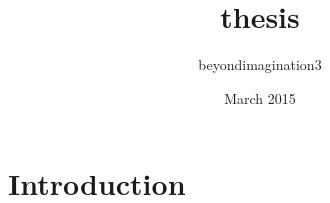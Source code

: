 \documentclass{article}
\title{thesis}
\author{beyondimagination3 }
\date{March 2015}
\begin{document}
 
\maketitle

\section{Introduction}
\end{document}
